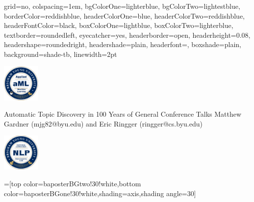 \documentclass[landscape,final]{baposter}
\begin{document}

\begin{poster}{
  grid=no,
  colspacing=1em,
  bgColorOne=lighterblue,
  bgColorTwo=lightestblue,
  borderColor=reddishblue,
  headerColorOne=blue,
  headerColorTwo=reddishblue,
  headerFontColor=black,
  boxColorOne=lightblue,
  boxColorTwo=lighterblue,
  textborder=roundedleft,
  eyecatcher=yes,
  headerborder=open,
  headerheight=0.08\textheight,
  headershape=roundedright,
  headershade=plain,
  headerfont=\Large\textsf, %
  boxshade=plain,
  background=shade-tb,
  linewidth=2pt
  }
  {{\begin{minipage}{7em}
    \includegraphics[height=5em]{amllogo.eps}
  \end{minipage}}
  }
  {\sf %
  Automatic Topic Discovery in 100 Years of General Conference Talks}
  {\sf %
  Matthew Gardner
  (mjg82@byu.edu)
  and
  Eric Ringger
  (ringger@cs.byu.edu)
  }
  {{\begin{minipage}{7em}
    \hfill
    \includegraphics[height=5em]{byunlp.eps}
  \end{minipage}}
  }

  =[top color=baposterBGtwo!30!white,bottom color=baposterBGone!30!white,shading=axis,shading angle=30]


\end{poster}
\end{document}
